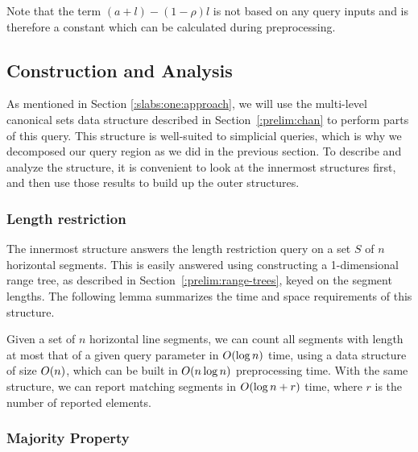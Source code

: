 Note that the term $(a + l) - (1 - \rho)l$ is not based on any query inputs and is therefore a constant which can be calculated during preprocessing.


\subsection{Construction and Analysis}
\label{:slabs:one:analysis}

As mentioned in Section \ref{:slabs:one:approach}, we will use the multi-level canonical sets data structure described in Section~\ref{:prelim:chan} to perform parts of this query.  This structure is well-suited to simplicial queries, which is why we decomposed our query region as we did in the previous section. To describe and analyze the structure, it is convenient to look at the innermost structures first, and then use those results to build up the outer structures.


\subsubsection{Length restriction}

The innermost structure answers the length restriction query on a set $S$ of $n$ horizontal segments. This is easily answered using constructing a 1-dimensional range tree, as described in Section~\ref{:prelim:range-trees}, keyed on the segment lengths. The following lemma summarizes the time and space requirements of this structure.

\begin{lemma}
\label{lem:slabs:one:step1}
Given a set of $n$ horizontal line segments, we can count all segments with length at most that of a given query parameter in $O\!\left(\log{n}\right)$ time, using a data structure of size $O\!\left(n\right)$, which can be built in $O\!\left(n \log{n}\right)$ preprocessing time. With the same structure, we can report matching segments in $O\!\left(\log{n} + r\right)$ time, where $r$ is the number of reported elements.
\end{lemma}


\subsubsection{Majority Property}

